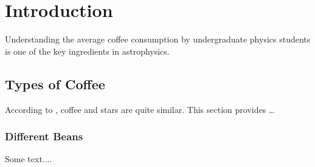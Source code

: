 
\chapter{Introduction}
\label{chap:intro}

Understanding the average coffee consumption by undergraduate physics students
is one of the key ingredients in astrophysics.

\section{Types of Coffee}
\label{sec:intro_coffee}

According to \textcite{kww}, coffee and stars are quite similar. This section
provides \ldots


\subsection{Different Beans}
\label{sec:intro_coffee_beans}

Some text....